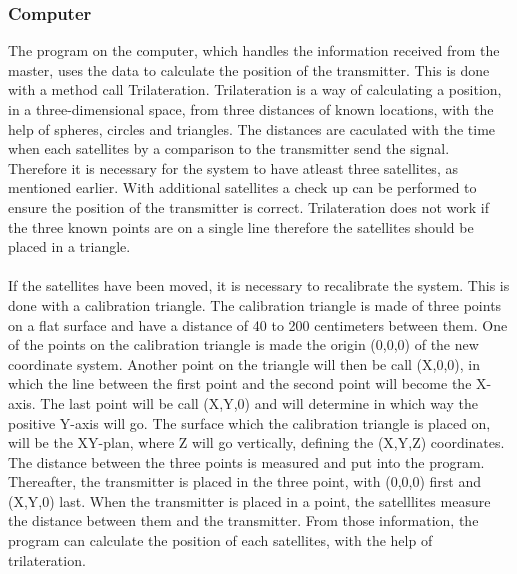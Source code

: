\subsubsection{Computer}
The program on the computer, which handles the information received from the master, uses the data to calculate the position of the transmitter. This is done with a method call Trilateration. Trilateration is a way of calculating a position, in a three-dimensional space, from three distances of known locations, with the help of spheres, circles and triangles. The distances are caculated with the time when each satellites by a comparison to the transmitter send the signal. Therefore it is necessary for the system to have atleast three satellites, as mentioned earlier.  With additional satellites a check up can be performed to ensure the position of the transmitter is correct. Trilateration does not work if the three known points are on a single line therefore the satellites should be placed in a triangle.\\\\
\noindent
If the satellites have been moved, it is necessary to recalibrate the system. This is done with a calibration triangle. The calibration triangle is made of three points on a flat surface and have a distance of 40 to 200 centimeters between them. One of the points on the calibration triangle is made the origin (0,0,0) of the new coordinate system. Another point on the triangle will then be call (X,0,0), in which the line between the first point and the second point will become the X-axis. The last point will be call (X,Y,0) and will determine in which way the positive Y-axis will go. The surface which the calibration triangle is placed on, will be the XY-plan, where Z will go vertically, defining the (X,Y,Z) coordinates. The distance between the three points is measured and put into the program. Thereafter, the transmitter is placed in the three point, with (0,0,0) first and (X,Y,0) last. When the transmitter is placed in a point, the satelllites measure the distance between them and the transmitter. From those information, the program can calculate the position of each satellites, with the help of trilateration. \\\\

